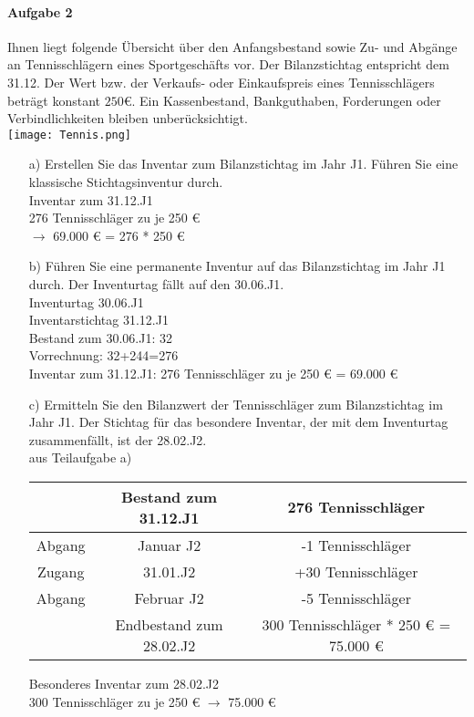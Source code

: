 \documentclass[paper=a4, fontsize=11pt]{scrartcl}
\numberwithin{equation}{section}
\numberwithin{figure}{section}
\numberwithin{table}{section}
\begin{document}
\paragraph{Aufgabe 2}
Ihnen liegt folgende Übersicht über den Anfangsbestand sowie Zu- und Abgänge an Tennisschlägern eines Sportgeschäfts vor. Der Bilanzstichtag entspricht dem 31.12. Der Wert bzw. der Verkaufs- oder Einkaufspreis eines Tennisschlägers beträgt konstant $250 €$. Ein Kassenbestand, Bankguthaben, Forderungen oder Verbindlichkeiten bleiben unberücksichtigt. \\
\texttt{[image: Tennis.png]} \\
\begin{itemize}
\item[a)] Erstellen Sie das Inventar zum Bilanzstichtag im Jahr J1. Führen Sie eine klassische Stichtagsinventur durch. \\

Inventar zum 31.12.J1 \\
276 Tennisschläger zu je 250 € \\
$\rightarrow$ 69.000 € = 276 * 250 € 

\item[b)] Führen Sie eine permanente Inventur auf das Bilanzstichtag im Jahr J1 durch. Der Inventurtag fällt auf den 30.06.J1. \\

Inventurtag 30.06.J1 \\
Inventarstichtag 31.12.J1 \\
Bestand zum 30.06.J1: 32 \\
Vorrechnung: 32+244=276 \\
Inventar zum 31.12.J1: 276 Tennisschläger zu je 250 € = 69.000 € 

\item[c)] Ermitteln Sie den Bilanzwert der Tennisschläger zum Bilanzstichtag im Jahr J1. Der Stichtag für das besondere Inventar, der mit dem Inventurtag zusammenfällt, ist der 28.02.J2. \\

aus Teilaufgabe a) \\
\begin{tabular}{|c|c|c|}
\hline
 & Bestand zum 31.12.J1 & 276 Tennisschläger \\\hline
 Abgang & Januar J2 & -1 Tennisschläger \\
 Zugang & 31.01.J2 & +30 Tennisschläger \\
 Abgang & Februar J2 & -5 Tennisschläger \\\hline
 & Endbestand zum 28.02.J2 & 300 Tennisschläger * 250 € = 75.000 €
\end{tabular}
Besonderes Inventar zum 28.02.J2 \\
300 Tennisschläger zu je 250 € $\rightarrow$ 75.000 € \\


\end{itemize}
\end{document}
